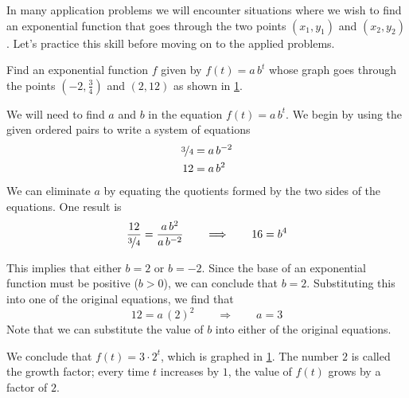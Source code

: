 In many application problems we will encounter situations where we wish to find an exponential function that 
goes through the two points $(x_1,y_1)$ and $(x_2,y_2)$. Let's practice this skill before moving on to the applied problems. 
\begin{pccexample} \label{exp:ex:findab}
	Find an exponential function $f$ given by $f(t)=a\,b^t$ whose graph goes through the points $\left(-2,\frac{3}{4}\right)$ and $(2,12)$
	as shown in \cref{exp:fig:expmodellingwithcurve}.
	\begin{figure}
		\centering
		\caption{}
		\label{exp:fig:expmodellingwithcurve}
	\end{figure}
										
	\begin{pccsolution}
		We will need to find $a$ and $b$ in the equation $f(t)=a\,b^t$. We begin by using the given ordered pairs to write a system 
		of equations
		\begin{align*}
			\nicefrac{3}{4} & =  a\,b^{-2} \\
			12              & =  a\,b^2    
		\end{align*}
		We can eliminate $a$ by equating the quotients formed by the two sides of the equations. One 
		result is 
		\begin{equation*}
			\frac{12}{\nicefrac{3}{4}} = \frac{a\,b^{2}}{a\,b^{-2}}\qquad \Longrightarrow\qquad 16 = b^4
		\end{equation*}
																	
		This implies that either $b=2$ or $b=-2$. Since the base of an exponential function must be 
		positive ($b>0$), we can conclude that $b=2$. Substituting this into one of the original equations, we find that
		\begin{equation*}
			12 = a\,(2)^2 \qquad \Longrightarrow\qquad a = 3
		\end{equation*}
		Note that we can substitute the value of $b$ into either of the original equations.
																	
		We conclude that $f(t)=3\cdot 2^t$, which is graphed in \cref{exp:fig:expmodellingwithcurve}.
		The number $2$ is called the growth factor; every time $t$ increases by $1$, the value of $f(t)$ 
		grows by a factor of $2$.
	\end{pccsolution}
\end{pccexample}
			
